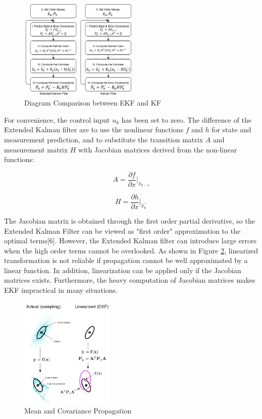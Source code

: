 \documentclass[10pt,twocolumn,letterpaper]{article}
\begin{document}
\begin{figure}[h]
     \centering
       \includegraphics[width=0.5\textwidth]{EKF.png}
         \caption{\small{Diagram Comparison between EKF and KF}}
         \label{fig: EKF}
 \end{figure}
For convenience, the control input $u_k$ has been set to zero. The difference of the Extended Kalman filter are to use the nonlinear functions $f$ and $h$ for state and measurement prediction, and to substitute the transition matrix $A$ and measurement matrix $H$ with Jacobian matrices derived from the non-linear functions:

\begin{equation}
A=\frac{\partial f}{\partial x}|_{\hat{x}_{k-1}}
\end{equation}

\begin{equation}
H=\frac{\partial h}{\partial x}|_{\hat{x}_k^-}
\end{equation}

The Jacobian matrix is obtained through the first order partial derivative, so the Extended Kalman Filter can be viewed as "first order" approximation to the optimal terms[6]. However, the Extended Kalman filter can introduce large errors when the high order terms cannot be overlooked. As shown in Figure \ref{fig: mean and cov prop}\cite{ref:cyrill}, linearized transformation is not reliable if propagation cannot be well approximated by a linear function\cite{ref:ye}. In addition, linearization can be applied only if the Jacobian matrices exists. Furthermore, the heavy computation of Jacobian matrices makes EKF impractical in many situations.

\begin{figure}[h]
     \centering
       \includegraphics[width=0.4\textwidth]{pic_2.png}
        \caption{\small{Mean and Covariance Propagation}}
        \label{fig: mean and cov prop}
 \end{figure}
\end{document}
